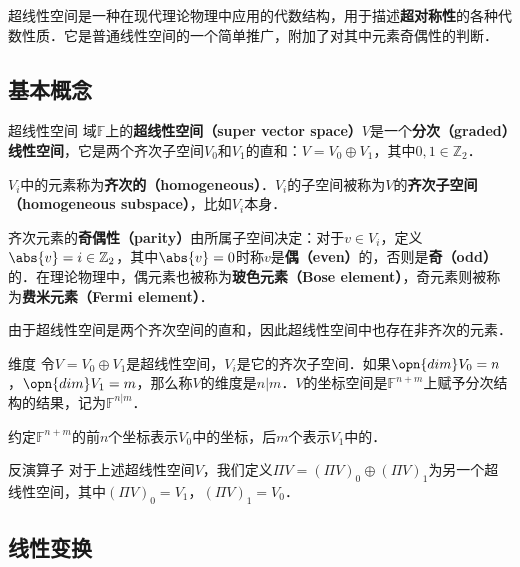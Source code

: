 


超线性空间是一种在现代理论物理中应用的代数结构，用于描述\textbf{超对称性}的各种代数性质．它是普通线性空间的一个简单推广，附加了对其中元素奇偶性的判断．

\subsection{基本概念}

\begin{definition}{超线性空间}
域$\mathbb{F}$上的\textbf{超线性空间（super vector space）}$V$是一个\textbf{分次（graded）线性空间}，它是两个齐次子空间$V_0$和$V_1$的直和：$V=V_0\oplus V_1$，其中$0, 1\in \mathbb{Z}_2$．
\end{definition}


$V_i$中的元素称为\textbf{齐次的（homogeneous）}．$V_i$的子空间被称为$V$的\textbf{齐次子空间（homogeneous subspace）}，比如$V_i$本身．

齐次元素的\textbf{奇偶性（parity）}由所属子空间决定：对于$v\in V_i$，定义$\abs{v}=i\in\mathbb{Z}_2$，其中$\abs{v}=0$时称$v$是\textbf{偶（even）}的，否则是\textbf{奇（odd）}的．在理论物理中，偶元素也被称为\textbf{玻色元素（Bose element）}，奇元素则被称为\textbf{费米元素（Fermi element）}．

由于超线性空间是两个齐次空间的直和，因此超线性空间中也存在非齐次的元素．

\begin{definition}{维度}
令$V=V_0\oplus V_1$是超线性空间，$V_i$是它的齐次子空间．如果$\opn{dim}V_0=n$，$\opn{dim}V_1=m$，那么称$V$的维度是$n|m$．$V$的坐标空间是$\mathbb{F}^{n+m}$上赋予分次结构的结果，记为$\mathbb{F}^{n|m}$．

约定$\mathbb{F}^{n+m}$的前$n$个坐标表示$V_0$中的坐标，后$m$个表示$V_1$中的．
\end{definition}

\begin{definition}{反演算子}
对于上述超线性空间$V$，我们定义$\Pi V=(\Pi V)_0\oplus(\Pi V)_1$为另一个超线性空间，其中$(\Pi V)_0=V_1$，$(\Pi V)_1=V_0$．
\end{definition}


\subsection{线性变换}

